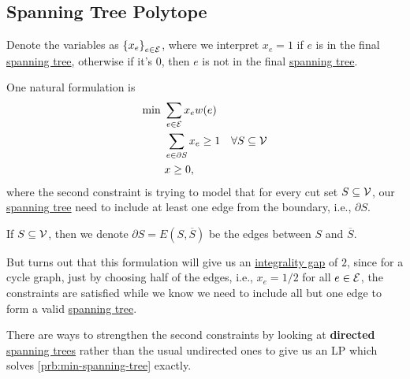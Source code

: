 \subsection{Spanning Tree Polytope}
Denote the variables as \(\left\{ x_e \right\} _{e\in \mathcal{\MakeUppercase{e}} }\), where we interpret \(x_e = 1\) if \(e\) is in the final \hyperref[def:spanning-tree]{spanning tree}, otherwise if it's \(0\), then \(e\) is not in the final \hyperref[def:spanning-tree]{spanning tree}.

One natural formulation is
\[
	\begin{aligned}
		\min~ & \sum_{e\in \mathcal{\MakeUppercase{e}} } x_e w(e)                                  \\
		      & \sum_{e\in \partial S} x_e \geq 1                 & \forall S\subseteq \mathcal{V} \\
		      & x \geq 0,
	\end{aligned}
\]
where the second constraint is trying to model that for every cut set \(S \subseteq \mathcal{\MakeUppercase{v}} \), our \hyperref[def:spanning-tree]{spanning tree} need to include at least one edge from the boundary, i.e., \(\partial S\).

\begin{notation}
	If \(S \subseteq \mathcal{\MakeUppercase{v}} \), then we denote \(\partial S = E(S, \overline{S} )\) be the edges between \(S\) and \(\overline{S} \).
\end{notation}

But turns out that this formulation will give us an \hyperref[def:integrality-gap]{integrality gap} of \(2\), since for a cycle graph, just by choosing half of the edges, i.e., \(x_e = 1 / 2\) for all \(e\in \mathcal{\MakeUppercase{e}} \), the constraints are satisfied while we know we need to include all but one edge to form a valid \hyperref[def:spanning-tree]{spanning tree}.

\begin{remark}
	There are ways to strengthen the second constraints by looking at \textbf{directed} \hyperref[def:spanning-tree]{spanning trees} rather than the usual undirected ones to give us an LP which solves \autoref{prb:min-spanning-tree} exactly.
\end{remark}

